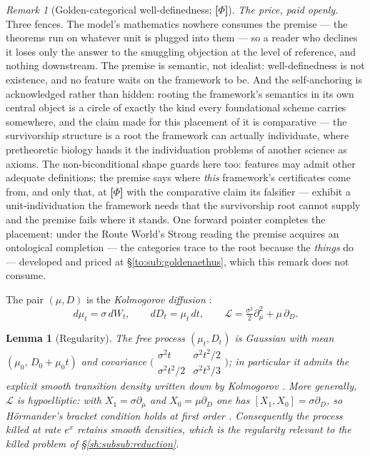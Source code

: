 \documentclass[11pt]{article}
\numberwithin{equation}{section}
\theoremstyle{plain}
\newtheorem{lemma}[theorem]{Lemma}
\theoremstyle{definition}
\theoremstyle{remark}
\newtheorem{remark}[theorem]{Remark}
\newcommand{\Lc}{\mathcal{L}}
\begin{document}
\begin{remark}[Golden-categorical well-definedness; \textbf{[$\Phi$]}]
\emph{The price, paid openly.} Three fences. The model's mathematics
nowhere consumes the premise --- the theorems run on whatever unit is
plugged into them --- so a reader who declines it loses only the
answer to the smuggling objection at the level of reference, and
nothing downstream. The premise is semantic, not idealist:
well-definedness is not existence, and no feature waits on the
framework to be. And the self-anchoring is acknowledged rather than
hidden: rooting the framework's semantics in its own central object
is a circle of exactly the kind every foundational scheme carries
somewhere, and the claim made for this placement of it is
comparative --- the survivorship structure is a root the framework
can actually individuate, where pretheoretic biology hands it the
individuation problems of another science as axioms. The
non-biconditional shape guards here too: features may admit other
adequate definitions; the premise says where \emph{this} framework's
certificates come from, and only that, at \textbf{[$\Phi$]} with the
comparative claim its falsifier --- exhibit a unit-individuation the
framework needs that the survivorship root cannot supply and the
premise fails where it stands. One forward pointer completes the
placement: under the Route World's Strong reading the premise acquires
an ontological completion --- the categories trace to the root because
the \emph{things} do --- developed and priced at
\S\ref{to:sub:goldenaethus}, which this remark does not consume.
\end{remark}

The pair $(\mu,D)$ is the \emph{Kolmogorov diffusion} \cite{Kol34}:
\begin{equation}\label{sh:eq:kolm}
d\mu_t=\sigma\,dW_t,\qquad dD_t=\mu_t\,dt,\qquad
\Lc=\tfrac{\sigma^2}{2}\partial_\mu^2+\mu\,\partial_D .
\end{equation}

\begin{lemma}[Regularity]\label{sh:lem:hypo}
The free process $(\mu_t,D_t)$ is Gaussian with mean
$(\mu_0,\,D_0+\mu_0t)$ and covariance
$\bigl(\begin{smallmatrix}\sigma^2t&\sigma^2t^2/2\\
\sigma^2t^2/2&\sigma^2t^3/3\end{smallmatrix}\bigr)$;
in particular it admits the explicit smooth transition density written down
by Kolmogorov \cite{Kol34}. More generally, $\Lc$ is hypoelliptic: with
$X_1=\sigma\partial_\mu$ and $X_0=\mu\partial_D$ one has
$[X_1,X_0]=\sigma\partial_D$, so H\"ormander's bracket condition holds at
first order \cite{Hor67}. Consequently the process killed at rate $e^{x}$
retains smooth densities, which is the regularity relevant to the killed
problem of \S\ref{sh:subsub:reduction}.
\end{lemma}
\end{document}
